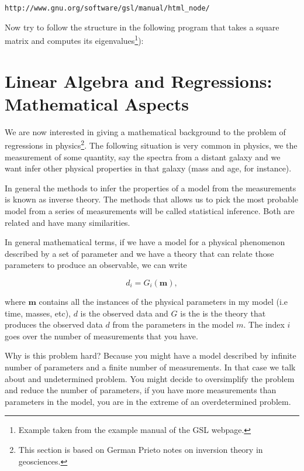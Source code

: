 \documentclass{article}
\begin{document}
\begin{verbatim}
http://www.gnu.org/software/gsl/manual/html_node/
\end{verbatim}

Now try to follow the structure in the following program that takes a square matrix and computes its eigenvalues\footnote{Example taken from the example manual of the GSL webpage.}):




\section{Linear Algebra and Regressions: Mathematical Aspects}

We are now interested in giving a mathematical background to the problem of regressions in physics\footnote{This section is based on German Prieto notes on inversion theory in geosciences.}. 
The following situation is very common in physics, we the measurement of some quantity, say the spectra from a distant galaxy and we want infer other physical properties in that galaxy (mass and age, for instance).

In general the methods to infer the properties of a model from the measurements is known as inverse theory. The methods that allows us to pick the most probable model from a series of measurements will be called statistical inference. Both are related and have many similarities.

In general mathematical terms, if we have a model for a physical phenomenon described by a set of parameter and we have a theory that can relate those parameters to produce an observable, we can write

\begin{equation}
d_{i} = G_i (\mathbf{m}),
\end{equation}

where ${\mathbf m}$ contains all the instances of the physical parameters in my model (i.e time, masses, etc), $d$ is the observed data and $G$ is the is the theory that produces the observed data $d$ from the parameters in the model $m$. The index $i$ goes over the number of measurements that you have.

Why is this problem hard? Because you might have a model described by infinite number of parameters and a finite number of measurements. In that case we talk about and undetermined problem. You might decide to oversimplify the problem and reduce the number of parameters, if you have more measurements than parameters in the model, you are in the extreme of an overdetermined problem.
\end{document}
